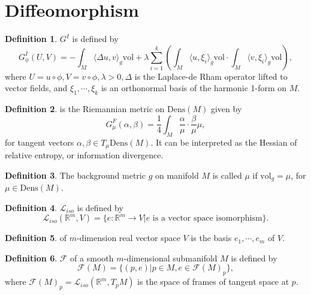 \documentclass[a4paper]{article}
\theoremstyle{definition}
\newtheorem{definition}{Definition}
\theoremstyle{plain}
\begin{document}
\section{Diffeomorphism}
\begin{definition}
 $G^I$ is defined by
\begin{equation*}
    G^I_\phi(U,V)=-\int_M\langle\Delta u,v\rangle_g \mathrm{vol}+\lambda\sum^k_{i=1}\left(\int_M\langle u,\xi_i\rangle_g \mathrm{vol}\cdot\int_M\langle v,\xi_i\rangle_g \mathrm{vol}\right),
\end{equation*}
where $U=u\circ\phi, V=v\circ\phi, \lambda>0, \Delta$ is the Laplace-de Rham operator lifted to vector fields, and $\xi_1,\cdots,\xi_k$ is an orthonormal basis of the harmonic 1-form on $M$.
\end{definition}

\begin{definition}
 is the Riemannian metric on $\mathrm{Dens}(M)$ given by
\begin{equation*}
    G^F_\mu(\alpha,\beta)=\frac{1}{4}\int_M\frac{\alpha}{\mu}\cdot\frac{\beta}{\mu}\mu,
\end{equation*}
for tangent vectors $\alpha,\beta\in T_\mu\mathrm{Dens}(M)$. It can be interpreted as the Hessian of relative entropy, or information divergence.
\end{definition}

\begin{definition}
The background metric $g$ on manifold $M$ is called  $\mu$ if $\mathrm{vol}_g=\mu$, for $\mu\in\mathrm{Dens}(M)$.
\end{definition}

\begin{definition}
 $\mathcal{L}_{iso}$ is defined by
\begin{equation*}
    \mathcal{L}_{iso}(\mathbb{R}^m,V)=\{e:\mathbb{R}^m\rightarrow V|e \text{ is a vector space isomorphism}\}.
\end{equation*}
\end{definition}

\begin{definition}
 of $m$-dimension real vector space $V$ is the basis $e_1,\cdots,e_m$ of $V$.
\end{definition}

\begin{definition}
 $\mathcal{F}$ of a smooth $m$-dimensional submanifold $M$ is defined by
\begin{equation*}
    \mathcal{F}(M)=\{(p,e)|p\in M,e\in\mathcal{F}(M)_p\},
\end{equation*}
where $\mathcal{F}(M)_p=\mathcal{L}_{iso}(\mathbb{R}^m,T_pM)$ is the space of frames of tangent space at $p$.
\end{definition}
\end{document}
